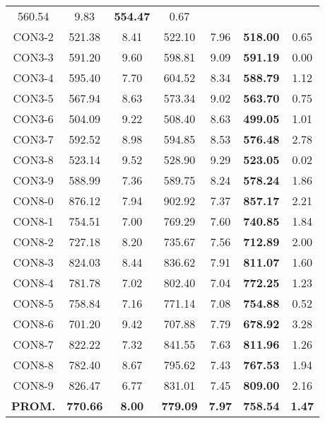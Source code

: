 \begin{table}[ht]
\begin{tabular}{c c c c c c c}
560.54 & 9.83 & \bf{554.47} & 
0.67\\CON3-2 & 521.38 & 8.41 & 
522.10 & 7.96 & \bf{518.00} & 
0.65\\CON3-3 & 591.20 & 9.60 & 
598.81 & 9.09 & \bf{591.19} & 
0.00\\CON3-4 & 595.40 & 7.70 & 
604.52 & 8.34 & \bf{588.79} & 
1.12\\CON3-5 & 567.94 & 8.63 & 
573.34 & 9.02 & \bf{563.70} & 
0.75\\CON3-6 & 504.09 & 9.22 & 
508.40 & 8.63 & \bf{499.05} & 
1.01\\CON3-7 & 592.52 & 8.98 & 
594.85 & 8.53 & \bf{576.48} & 
2.78\\CON3-8 & 523.14 & 9.52 & 
528.90 & 9.29 & \bf{523.05} & 
0.02\\CON3-9 & 588.99 & 7.36 & 
589.75 & 8.24 & \bf{578.24} & 
1.86\\CON8-0 & 876.12 & 7.94 & 
902.92 & 7.37 & \bf{857.17} & 
2.21\\CON8-1 & 754.51 & 7.00 & 
769.29 & 7.60 & \bf{740.85} & 
1.84\\CON8-2 & 727.18 & 8.20 & 
735.67 & 7.56 & \bf{712.89} & 
2.00\\CON8-3 & 824.03 & 8.44 & 
836.62 & 7.91 & \bf{811.07} & 
1.60\\CON8-4 & 781.78 & 7.02 & 
802.40 & 7.04 & \bf{772.25} & 
1.23\\CON8-5 & 758.84 & 7.16 & 
771.14 & 7.08 & \bf{754.88} & 
0.52\\CON8-6 & 701.20 & 9.42 & 
707.88 & 7.79 & \bf{678.92} & 
3.28\\CON8-7 & 822.22 & 7.32 & 
841.55 & 7.63 & \bf{811.96} & 
1.26\\CON8-8 & 782.40 & 8.67 & 
795.62 & 7.43 & \bf{767.53} & 
1.94\\CON8-9 & 826.47 & 6.77 & 
831.01 & 7.45 & \bf{809.00} & 
2.16\\\bf{PROM.} & 
\bf{770.66} & \bf{8.00} & \bf{779.09} & \bf{7.97} & \bf{758.54} & \bf{1.47}\\[1ex]\hline
\end{tabular}
\label{table:nonlin}
\end{table} \clearpage
